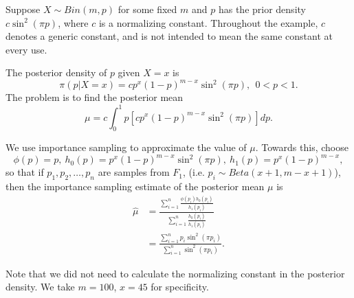 \begin{example}
	Suppose $X\sim Bin(m,p)$ for some fixed $m$ and $p$ has the prior density $c\sin^{2}(\pi p)$,
	where $c$ is a normalizing constant.
	Throughout the example, $c$ denotes a generic constant,
	and is not intended to mean the same constant at every use.

    The posterior density of $p$ given $X = x$ is
    \[
        \pi(p|X=x) = cp^{x}(1-p)^{m-x}\sin ^{2}(\pi p), \ \ 0<p<1.  
    \]
    The problem is to find the posterior mean
    \[
        \mu = c \int_{0}^{1} p[cp^{x}(1-p)^{m-x}\sin ^{2}(\pi p)]dp.
    \]

    We use importance sampling to approximate the value of $\mu$. Towards this, choose
    \[
        \phi(p)=p, \ h_0(p) = p^{x} (1-p)^{m-x} \sin ^{2}(\pi p),\ h_1(p) = p^{x}(1-p)^{m-x},   
    \]
    so that if $p_1,p_2,\ldots,p_n$ are samples from $F_1$, (i.e. $p_i\sim Beta(x+1, m-x+1)$),
    then the importance sampling estimate of the posterior mean $\mu$ is
    \begin{align*}
        \hat{\mu} &= \frac{\sum_{i=1}^{n}\frac{\phi(p_i)h_0(p_i)}{h_1(p_i)} }{\sum_{i=1}^{n}\frac{h_0(p_i)}{h_1(p_i)} } \\ 
                  &= \frac{\sum_{i=1}^{n}p_i\sin ^{2}(\pi p_i) }{\sum_{i=1}^{n} \sin ^{2}(\pi p_i) }.
    \end{align*}

    Note that we did not need to calculate the normalizing constant in the posterior density.
    We take $m=100$, $x=45$ for specificity.

\end{example}
